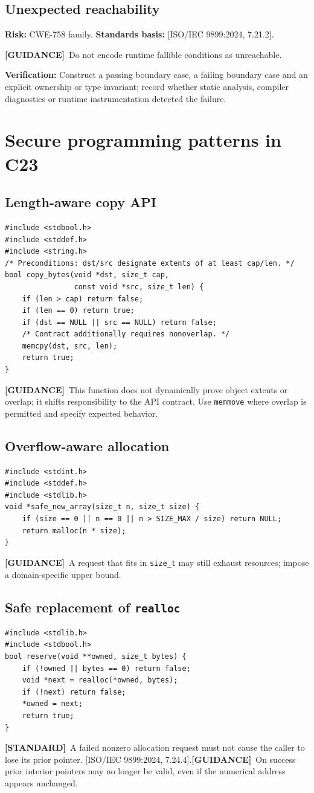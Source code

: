 \documentclass[10pt,letterpaper,oneside]{report}
\newcommand{\refcl}[1]{\textsf{\footnotesize[ISO/IEC 9899:2024, #1]}}
\newcommand{\standard}{\textbf{[STANDARD]}}
\newcommand{\guidance}{\textbf{[GUIDANCE]}}
\begin{document}
\section{Unexpected reachability}
\textbf{Risk:} CWE-758 family. \textbf{Standards basis:} \refcl{7.21.2}.\par\guidance\ Do not encode runtime fallible conditions as unreachable.\par\textbf{Verification:} Construct a passing boundary case, a failing boundary case and an explicit ownership or type invariant; record whether static analysis, compiler diagnostics or runtime instrumentation detected the failure.
\chapter{Secure programming patterns in C23}
\section{Length-aware copy API}
\begin{lstlisting}
#include <stdbool.h>
#include <stddef.h>
#include <string.h>
/* Preconditions: dst/src designate extents of at least cap/len. */
bool copy_bytes(void *dst, size_t cap,
                const void *src, size_t len) {
    if (len > cap) return false;
    if (len == 0) return true;
    if (dst == NULL || src == NULL) return false;
    /* Contract additionally requires nonoverlap. */
    memcpy(dst, src, len);
    return true;
}
\end{lstlisting}
\guidance\ This function does not dynamically prove object extents or overlap; it shifts responsibility to the API contract. Use \texttt{memmove} where overlap is permitted and specify expected behavior.
\section{Overflow-aware allocation}
\begin{lstlisting}
#include <stdint.h>
#include <stddef.h>
#include <stdlib.h>
void *safe_new_array(size_t n, size_t size) {
    if (size == 0 || n == 0 || n > SIZE_MAX / size) return NULL;
    return malloc(n * size);
}
\end{lstlisting}
\guidance\ A request that fits in \texttt{size\_t} may still exhaust resources; impose a domain-specific upper bound.
\section{Safe replacement of \texttt{realloc}}
\begin{lstlisting}
#include <stdlib.h>
#include <stdbool.h>
bool reserve(void **owned, size_t bytes) {
    if (!owned || bytes == 0) return false;
    void *next = realloc(*owned, bytes);
    if (!next) return false;
    *owned = next;
    return true;
}
\end{lstlisting}
\standard\ A failed nonzero allocation request must not cause the caller to lose its prior pointer. \refcl{7.24.4}.\guidance\ On success prior interior pointers may no longer be valid, even if the numerical address appears unchanged.
\end{document}
